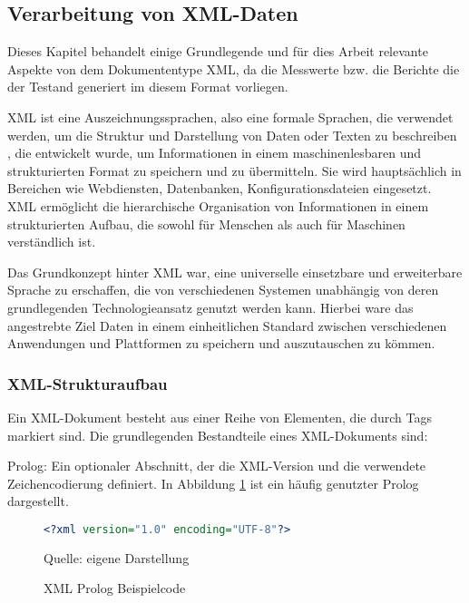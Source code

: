\subsection{Verarbeitung von XML-Daten}
\label{subsec:verarbeitung-von-xml-daten}

Dieses Kapitel behandelt einige Grundlegende und für dies Arbeit relevante Aspekte von dem Dokumententype \ac{XML},
da die Messwerte bzw. die Berichte die der Testand generiert im diesem Format vorliegen.


\ac{XML} ist eine Auszeichnungssprachen, also eine
formale Sprachen, die verwendet werden, um die Struktur und Darstellung von Daten oder Texten zu beschreiben \cite*{Neumann2019},
die entwickelt wurde, um Informationen in einem maschinenlesbaren und strukturierten Format zu speichern und zu übermitteln.
Sie wird hauptsächlich in Bereichen wie Webdiensten, Datenbanken, Konfigurationsdateien eingesetzt.
\ac{XML} ermöglicht die hierarchische Organisation von Informationen in einem strukturierten Aufbau, die sowohl für Menschen
als auch für Maschinen verständlich ist.

Das Grundkonzept hinter \ac{XML} war, eine universelle einsetzbare und erweiterbare Sprache zu erschaffen, die von verschiedenen Systemen
unabhängig von deren grundlegenden Technologieansatz genutzt werden kann.
Hierbei ware das angestrebte Ziel Daten in einem einheitlichen Standard zwischen verschiedenen Anwendungen und Plattformen zu speichern und auszutauschen
zu kömmen.

\subsubsection{XML-Strukturaufbau}

Ein \ac{XML}-Dokument besteht aus einer Reihe von Elementen, die durch Tags markiert sind.
Die grundlegenden Bestandteile eines \ac{XML}-Dokuments sind:

Prolog: Ein optionaler Abschnitt, der die \ac{XML}-Version und die verwendete Zeichencodierung definiert.
In Abbildung \ref{fig:XML Prolog Beispielcode} ist ein häufig genutzter Prolog dargestellt.

\begin{figure}[H]
\centering
\begin{minipage}{0.95\textwidth}
\begin{lstlisting}[language=XML]
<?xml version="1.0" encoding="UTF-8"?>
\end{lstlisting}
\end{minipage}
\caption{XML Prolog Beispielcode}
\label{fig:XML Prolog Beispielcode}
    {Quelle: eigene Darstellung}
\end{figure}

